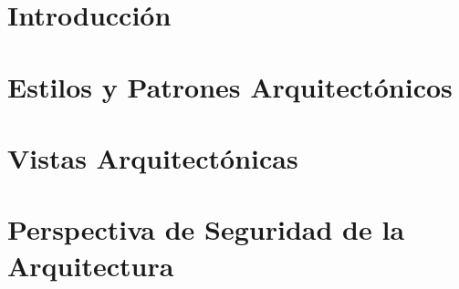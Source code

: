 \renewcommand{\contentsname}{Contenido}
\tableofcontents
\newpage

\section{Introducción}
\label{sec:intro}


\section{Estilos y Patrones Arquitectónicos}
\label{sec:epa}


\section{Vistas Arquitectónicas}
\label{sec:va}


\section{Perspectiva de Seguridad de la Arquitectura}
\label{sec:va}
